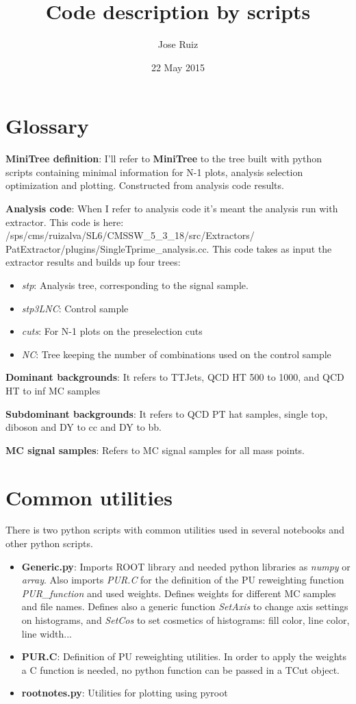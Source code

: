 \documentclass[11pt,a4paper]{article}
\title{Code description by scripts}
\author{Jose Ruiz}
\date{22 May 2015}
\begin{document}
\maketitle

\section*{Glossary}
\textbf{MiniTree definition}: I'll refer to \textbf{MiniTree} to the tree built with python scripts containing minimal information for N-1 plots, analysis selection optimization and plotting. Constructed from analysis code results.

\textbf{Analysis code}: When I refer to analysis code it's meant the analysis run with extractor. This code is here:  /sps/cms/ruizalva/SL6/CMSSW\_5\_3\_18/src/Extractors/\\PatExtractor/plugins/SingleTprime\_analysis.cc. This code takes as input the extractor results and builds up four trees:
\begin{itemize}
\item \textit{stp}: Analysis tree, corresponding to the signal sample.
\item \textit{stp3LNC}: Control sample
\item \textit{cuts}: For N-1 plots on the preselection cuts
\item \textit{NC}: Tree keeping the number of combinations used on the control sample
\end{itemize}

\textbf{Dominant backgrounds}: It refers to TTJets, QCD HT 500 to 1000, and QCD HT to inf MC samples

\textbf{Subdominant backgrounds}: It refers to QCD PT hat samples, single top, diboson and DY to cc and DY to bb.

\textbf{MC signal samples}: Refers to MC signal samples for all mass points.

\section{Common utilities}

There is two python scripts with common utilities used in several notebooks and other python scripts. 

\begin{itemize}
\item \textbf{Generic.py}: Imports ROOT library and needed python libraries as \textit{numpy} or \textit{array}. Also imports \textit{PUR.C} for the definition of the PU reweighting function \textit{PUR\_function} and used weights. Defines weights for different MC samples and file names. Defines also a generic function \textit{SetAxis} to change axis settings on histograms, and \textit{SetCos} to set cosmetics of histograms: fill color, line color, line width...
\item \textbf{PUR.C}: Definition of PU reweighting utilities. In order to apply the weights a C function is needed, no python function can be passed in a TCut object.
\item \textbf{rootnotes.py}: Utilities for plotting using pyroot
\end{itemize}
\end{document}

